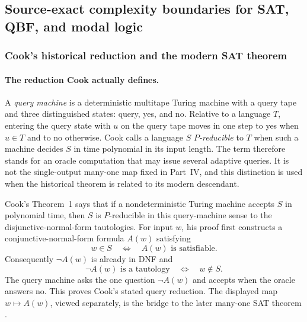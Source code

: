
\subsection{Source-exact complexity boundaries for SAT, QBF, and modal logic}
\label{sec:p09-presentation-n-c-026}

\subsubsection{Cook's historical reduction and the modern SAT theorem}

\paragraph{The reduction Cook actually defines.}
A \emph{query machine} is a deterministic multitape Turing machine with a
query tape and three distinguished states: query, yes, and no.  Relative to a
language \(T\), entering the query state with \(u\) on the query tape moves in
one step to yes when \(u\in T\) and to no otherwise.  Cook calls a language
\(S\) \emph{\(P\)-reducible} to \(T\) when such a machine decides \(S\) in
time polynomial in its input length.  The term therefore stands for an
oracle computation that may issue several adaptive queries.  It is not the
single-output many-one map fixed in Part~IV, and this distinction is used when
the historical theorem is related to its modern descendant.

Cook's Theorem~1 says that if a nondeterministic Turing machine accepts \(S\)
in polynomial time, then \(S\) is \(P\)-reducible in this query-machine sense
to the disjunctive-normal-form tautologies.  For input \(w\), his proof first
constructs a conjunctive-normal-form formula \(A(w)\) satisfying
\[
 w\in S
 \quad\Longleftrightarrow\quad
 A(w)\text{ is satisfiable}.
\]
Consequently \(\neg A(w)\) is already in DNF and
\[
 \neg A(w)\text{ is a tautology}
 \quad\Longleftrightarrow\quad
 w\notin S.
\]
The query machine asks the one question \(\neg A(w)\) and accepts when the
oracle answers no.  This proves Cook's stated query reduction.  The displayed
map \(w\mapsto A(w)\), viewed separately, is the bridge to the later many-one
SAT theorem \cite[pp.~151--156]{Cook1971}.

